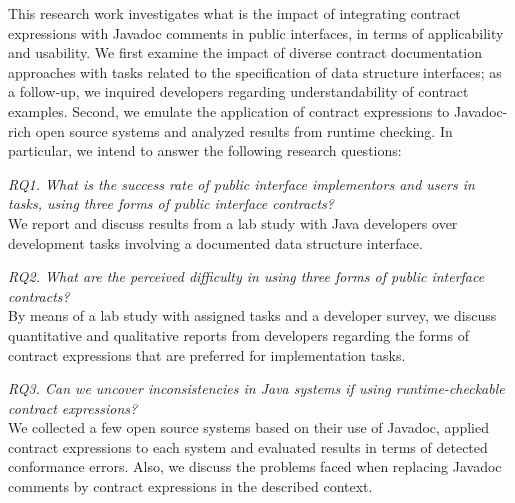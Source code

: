 This research work investigates what is the impact of integrating contract expressions with Javadoc comments in public interfaces, in terms of applicability and usability. We first examine the impact of diverse contract documentation approaches with tasks related to the specification of data structure interfaces; as a follow-up, we inquired developers regarding understandability of contract examples. Second, we emulate the application of contract expressions to Javadoc-rich open source systems and analyzed results from runtime checking. In particular, we intend to answer the following research questions:  

\noindent\emph{RQ1. What is the success rate of public interface implementors and users in tasks, using three forms of public interface contracts?}\\
We report and discuss results from a lab study with Java developers over development tasks involving a documented data structure interface.

  
\noindent\emph{RQ2. What are the perceived difficulty in using three forms of public interface contracts?}\\
By means of a lab study with assigned tasks and a developer survey, we discuss quantitative and qualitative reports from developers regarding the forms of contract expressions that are preferred for implementation tasks.


\noindent\emph{RQ3. Can we uncover inconsistencies in Java systems if using runtime-checkable contract expressions?}\\
We collected a few open source systems based on their use of Javadoc, applied contract expressions
to each system and evaluated results in terms of detected conformance errors. Also, we discuss the problems faced when replacing Javadoc comments by contract expressions in the described context.

